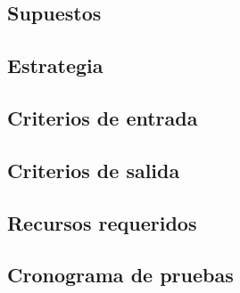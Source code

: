 \subsection{Supuestos}
\label{subsection:plan_pruebas:supuestos}

\tinylipsum

\subsection{Estrategia}
\label{subsection:plan_pruebas:estrategia}

\tinylipsum

\subsection{Criterios de entrada}
\label{subsection:plan_pruebas:criterios-entrada}

\tinylipsum

\subsection{Criterios de salida}
\label{subsection:plan_pruebas:criterios-salida}

\tinylipsum

\subsection{Recursos requeridos}
\label{subsection:plan_pruebas:recursos}

\tinylipsum

\subsection{Cronograma de pruebas}
\label{subsection:plan_pruebas:cronograma}
